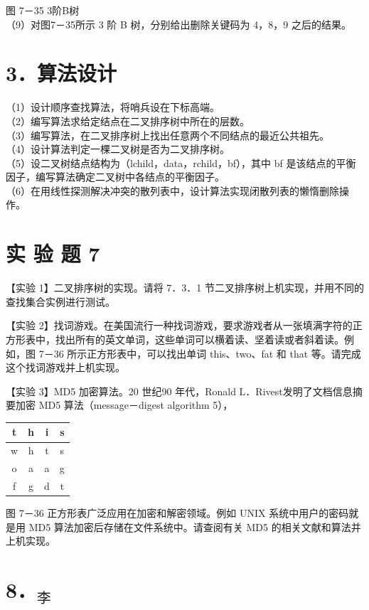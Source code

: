 \documentclass[10pt]{article}
\begin{document}
图 7－35 3阶B树\\
（9）对图7－35所示 3 阶 B 树，分别给出删除关键码为 4，8，9 之后的结果。

\section*{3．算法设计}
（1）设计顺序查找算法，将哨兵设在下标高端。\\
（2）编写算法求给定结点在二叉排序树中所在的层数。\\
（3）编写算法，在二叉排序树上找出任意两个不同结点的最近公共祖先。\\
（4）设计算法判定一棵二叉树是否为二叉排序树。\\
（5）设二叉树结点结构为（lchild，data，rchild，bf），其中 bf 是该结点的平衡因子，编写算法确定二叉树中各结点的平衡因子。\\
（6）在用线性探测解决冲突的散列表中，设计算法实现闭散列表的懒惰删除操作。

\section*{实 验 题 7}
【实验 1】二叉排序树的实现。请将 7．3．1 节二叉排序树上机实现，并用不同的查找集合实例进行测试。

【实验 2】找词游戏。在美国流行一种找词游戏，要求游戏者从一张填满字符的正方形表中，找出所有的英文单词，这些单词可以横着读、坚着读或者斜着读。例如，图 7－36 所示正方形表中，可以找出单词 this、two、fat 和 that 等。请完成这个找词游戏并上机实现。

【实验 3】MD5 加密算法。20 世纪90 年代，Ronald L．Rivest发明了文档信息摘要加密 MD5 算法（message－digest algorithm 5），

\begin{center}
\begin{tabular}{|c|c|c|c|}
\hline
t & h & i & s \\
\hline
w & h & t & s \\
\hline
o & a & a & g \\
\hline
f & g & d & t \\
\hline
\end{tabular}
\end{center}

图 7－36 正方形表广泛应用在加密和解密领域。例如 UNIX 系统中用户的密码就是用 MD5 算法加密后存储在文件系统中。请查阅有关 MD5 的相关文献和算法并上机实现。

\section*{8．${ }_{\text {李 }}$}
\end{document}
